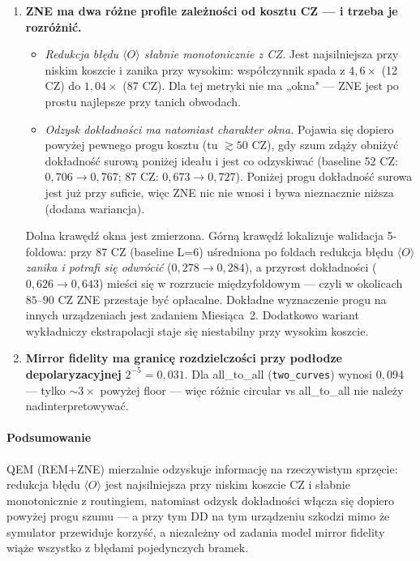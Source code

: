 \documentclass[11pt,a4paper]{article}
\begin{document}
\begin{enumerate}
\item \textbf{ZNE ma dwa różne profile zależności od kosztu CZ --- i trzeba je rozróżnić.}
      \begin{itemize}
      \item \emph{Redukcja błędu $\langle O\rangle$ słabnie monotonicznie z CZ.} Jest
            najsilniejsza przy niskim koszcie i zanika przy wysokim: współczynnik spada z
            $4{,}6\times$ (12 CZ) do $1{,}04\times$ (87 CZ). Dla tej metryki nie ma „okna" ---
            ZNE jest po prostu najlepsze przy tanich obwodach.
      \item \emph{Odzysk dokładności ma natomiast charakter okna.} Pojawia się dopiero powyżej pewnego progu kosztu (tu $\gtrsim50$
            CZ), gdy szum zdąży obniżyć dokładność surową poniżej ideału i jest co odzyskiwać
            (baseline 52 CZ: $0{,}706\to0{,}767$; 87 CZ: $0{,}673\to0{,}727$). Poniżej progu
            dokładność surowa jest już przy suficie, więc ZNE nic nie wnosi i bywa nieznacznie
            niższa (dodana wariancja).
      \end{itemize}
      Dolna krawędź okna jest zmierzona. Górną krawędź lokalizuje walidacja 5-foldowa: przy
      87 CZ (baseline L=6) uśredniona po foldach redukcja błędu $\langle O\rangle$
      \emph{zanika i potrafi się odwrócić} ($0{,}278\to0{,}284$), a przyrost dokładności
      ($0{,}626\to0{,}643$) mieści się w rozrzucie międzyfoldowym --- czyli w okolicach
      $85$--$90$ CZ ZNE przestaje być opłacalne. Dokładne wyznaczenie progu na innych
      urządzeniach jest zadaniem Miesiąca~2. Dodatkowo wariant wykładniczy ekstrapolacji staje
      się niestabilny przy wysokim koszcie.

\item \textbf{Mirror fidelity ma granicę rozdzielczości przy podłodze depolaryzacyjnej}
      $2^{-5}=0{,}031$. Dla all\_to\_all (\texttt{two\_curves}) wynosi $0{,}094$ --- tylko
      $\sim3\times$ powyżej floor --- więc różnic circular vs all\_to\_all nie należy
      nadinterpretowywać.
\end{enumerate}

\paragraph{Podsumowanie} QEM (REM${+}$ZNE) mierzalnie odzyskuje informację na rzeczywistym
sprzęcie: redukcja błędu $\langle O\rangle$ jest najsilniejsza przy niskim koszcie CZ i słabnie
monotonicznie z routingiem, natomiast odzysk dokładności włącza się dopiero powyżej progu
szumu --- a przy tym DD na tym urządzeniu szkodzi
mimo że symulator przewiduje korzyść, a niezależny od zadania model mirror fidelity wiąże
wszystko z błędami pojedynczych bramek.
\end{document}
